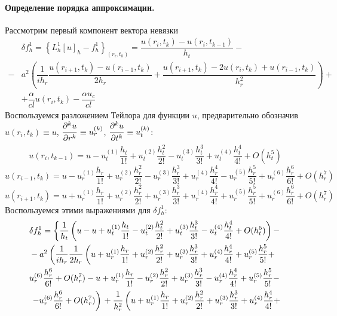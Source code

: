 \documentclass[a4paper,12pt,russian, fleqn]{extreport}
\begin{document}
 	\paragraph{Определение порядка аппроксимации.} Рассмотрим первый компонент вектора невязки
 	\begin{align}
 		& \delta f^1_h = \left\{ L^1_h[u]_h - f^1_h \right\} _{(r_i, t_k)} = \dfrac{u(r_i, t_k) - u(r_i, t_{k-1})}{h_t} - \nonumber \\ - 
 		& a^2\left( \dfrac{1}{ih_r}\dfrac{u(r_{i+1}, t_k) - u(r_{i-1}, t_k)}{2h_r} +\dfrac{u(r_{i+1}, t_k) - 2u(r_i, t_k) + u(r_{i-1}, t_k)}{h^2_r} \right) + \nonumber \\ 
 		& + \dfrac{\alpha}{cl}u(r_i, t_k) - \dfrac{\alpha u_c}{cl}
 	\end{align}
 	Воспользуемся разложением Тейлора для функции $u$, предварительно обозначив $u(r_i, t_k) \equiv u$, $\dfrac{\strut \partial^k u}{\strut \partial r^k} \equiv u^{(k)}_r$, $\dfrac{\strut \partial^k u}{\strut \partial t^{k}} \equiv u^{(k)}_t$:
 	\begin{equation*}
	 	u(r_i, t_{k-1}) = u - u^{(1)}_t\dfrac{h_t}{1!} + u^{(2)}_t\dfrac{h^2_t}{2!} - u^{(3)}_t\dfrac{h^3_t}{3!} + u^{(4)}_t\dfrac{h^4_t}{4!} + O(h_t^5)
 	\end{equation*}
 	\begin{equation*}
	 	u(r_{i-1}, t_{k}) = u - u^{(1)}_r\dfrac{h_r}{1!} + u^{(2)}_r\dfrac{h^2_r}{2!} - u^{(3)}_r\dfrac{h^3_r}{3!} + u^{(4)}_r\dfrac{h^4_r}{4!} - u^{(5)}_r\dfrac{h^5_r}{5!} + u^{(6)}_r\dfrac{h^6_r}{6!} + O(h_r^7)
 	\end{equation*}
 	\begin{equation*}
		u(r_{i+1}, t_{k}) = u + u^{(1)}_r\dfrac{h_r}{1!} + u^{(2)}_r\dfrac{h^2_r}{2!} + u^{(3)}_r\dfrac{h^3_r}{3!} + u^{(4)}_r\dfrac{h^4_r}{4!} + u^{(5)}_r\dfrac{h^5_r}{5!} + u^{(6)}_r\dfrac{h^6_r}{6!} + O(h_r^7)
 	\end{equation*}
 	Воспользуемся этими выражениями для $\delta f_h^1$:
 	\begin{align}
 		& \delta f_h^1 = \left\{ \dfrac{1}{h_t}\left( u - u + u^{(1)}_t\dfrac{h_t}{1!} - u^{(2)}_t\dfrac{h^2_t}{2!} + u^{(3)}_t\dfrac{h^3_t}{3!} - u^{(4)}_t\dfrac{h^4_t}{4!} + O(h_t^5) \right) - \nonumber \right. \\
 		& - a^2 \left( \dfrac{1}{ih_r} \dfrac{1}{2h_r} \left( u + u^{(1)}_r\dfrac{h_r}{1!} + u^{(2)}_r\dfrac{h^2_r}{2!} + u^{(3)}_r\dfrac{h^3_r}{3!} + u^{(4)}_r\dfrac{h^4_r}{4!} + u^{(5)}_r\dfrac{h^5_r}{5!} + \right. \right. \nonumber \\
 		& u^{(6)}_r\dfrac{h^6_r}{6!} + O(h_r^7) - u + u^{(1)}_r\dfrac{h_r}{1!} - u^{(2)}_r\dfrac{h^2_r}{2!} + u^{(3)}_r\dfrac{h^3_r}{3!} - u^{(4)}_r\dfrac{h^4_r}{4!} + u^{(5)}_r\dfrac{h^5_r}{5!} - \nonumber \\
 		& \left. \left. - u^{(6)}_r\dfrac{h^6_r}{6!} + O(h_r^7) \right) \right. + \dfrac{\strut 1}{\strut h_r^2}\left( u + u^{(1)}_r\dfrac{h_r}{1!} + u^{(2)}_r\dfrac{h^2_r}{2!} + u^{(3)}_r\dfrac{h^3_r}{3!} + u^{(4)}_r\dfrac{h^4_r}{4!} + \right. \nonumber
 	\end{align}
\end{document}
